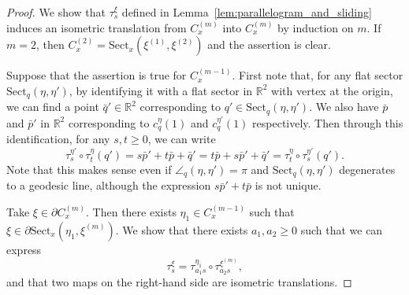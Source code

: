 \documentclass[12pt]{amsart}
\numberwithin{equation}{section}
\theoremstyle{plain}
\theoremstyle{definition}
\theoremstyle{remark}
\newcommand{\R}{{\mathbb R}}
\newcommand{\xxi}[1]{\xi^{(#1)}}
\newcommand{\cc}[2]{c_{#1}^{#2}}
\newcommand{\trans}[2]{\tau_{#1}^{#2}}
\newcommand{\sect}[3][]{\mathrm{Sect}_{#1}(#2,#3)}
\newcommand{\cone}[2][]{C_{#1}^{(#2)}}
\begin{document}
\begin{proof}
 We show that $\trans{s}{\xi}$ defined in
 Lemma~\ref{lem:parallelogram_and_sliding} induces an
 isometric translation from $\cone[x]{m}$ into $\cone[x]{m}$ by
 induction on $m$. 
 If $m=2$, then 
 $\cone[x]{2}=\sect[x]{\xxi{1}}{\xxi{2}}$ and the
 assertion is clear. 

 Suppose that the assertion is true for $\cone[x]{m-1}$.
 First note that, for any flat sector $\sect[q]{\eta}{\eta'}$, by
 identifying it with a flat sector in $\R^2$ with vertex at the origin,
 we can find a point $\bar q' \in \R^2$ corresponding to 
 $q' \in \sect[q]{\eta}{\eta'}$. 
 We also have $\bar p$ and $\bar p'$ in $\R^2$ corresponding to
 $\cc{q}{\eta}(1)$ and $\cc{q}{\eta'}(1)$ respectively. 
 Then through this identification, for any $s,t \geq 0$, we can write 
 \begin{equation}
 \label{eq:tau_commutative}
  \trans{s}{\eta'}\circ \trans{t}{\eta}(q') = s\bar p'+t\bar p+\bar q'
 = t\bar p+s\bar p' + \bar q' = \trans{t}{\eta}\circ \trans{s}{\eta'}(q'). 
 \end{equation}
 Note that this makes sense even if $\angle_q(\eta,\eta')=\pi$
 and $\sect[q]{\eta}{\eta'}$ degenerates to a geodesic line,
 although the expression $s\bar p'+t\bar p$ is not unique. 

 Take $\xi \in \partial \cone[x]{m}$. 
 Then there exists $\eta_1 \in \cone[x]{m-1}$ such that 
 $\xi\in \partial \sect[x]{\eta_1}{\xxi{m}}$. 
 We show that there exists $a_1, a_2\geq 0$ such that we can express  
 \begin{equation*}
 \trans{s}{\xi}=\tau_{a_1 s}^{\eta_1}\circ \trans{a_2 s}{\xxi{m}}, 
 \end{equation*}
 and that two maps on the right-hand side are isometric translations. 


\end{proof}
\end{document}
